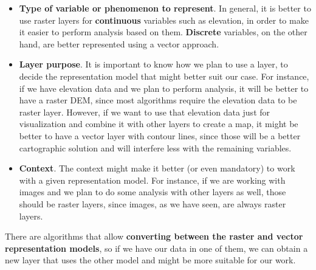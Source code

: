 \begin{itemize}
 \item \textbf{Type of variable or phenomenon to represent}. In general, it is better to use raster layers for \textbf{continuous} variables such as elevation, in order to make it easier to perform analysis based on them. \textbf{Discrete} variables, on the other hand, are better represented using a vector approach.
\item \textbf{Layer purpose}. It is important to know how we plan to use a layer, to decide the representation model that might better suit our case. For instance, if we have elevation data and we plan to perform analysis, it will be better to have a raster DEM, since most algorithms require the elevation data to be raster layer. However, if we want to use that elevation data just for visualization and combine it with other layers to create a map, it might be better to have a vector layer with contour lines, since those will be a better cartographic solution and will interfere less with the remaining variables. 
\item \textbf{Context}. The context might make it better (or even mandatory) to work with a given representation model. For instance, if we are working with images and we plan to do some analysis with other layers as well, those should be raster layers, since images, as we have seen, are always raster layers.
\end{itemize}

There are algorithms that allow \textbf{converting between the raster and vector representation models}, so if we have our data in one of them, we can obtain a new layer that uses the other model and might be more suitable for our work.

\pagestyle{empty}
